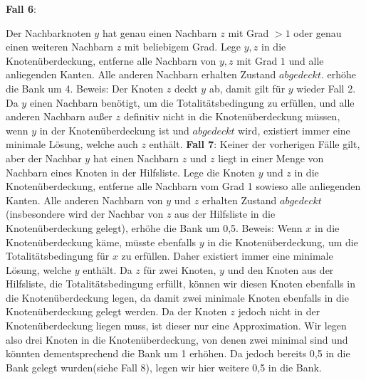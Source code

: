 \documentclass[12pt,onecolumn, notitlepage]{scrartcl}
\begin{document}
\textbf{Fall 6}:\newline
\begin{center}
\end{center}
Der Nachbarknoten $y$ hat genau einen Nachbarn $z$ mit Grad $> 1$ oder genau einen weiteren Nachbarn $z$ mit beliebigem Grad. Lege $y,z$ in die Knotenüberdeckung, entferne alle Nachbarn von $y,z$ mit Grad $1$ und alle anliegenden Kanten. Alle anderen Nachbarn erhalten Zustand $abgedeckt$.  erhöhe die Bank um 4.\newline
Beweis: Der Knoten $z$ deckt $y$ ab, damit gilt für $y$ wieder Fall 2. Da $y$ einen Nachbarn benötigt, um die Totalitätsbedingung zu erfüllen, und alle anderen Nachbarn außer $z$ definitiv nicht in die Knotenüberdeckung müssen, wenn $y$ in der Knotenüberdeckung ist und $abgedeckt$ wird, existiert immer eine minimale Lösung, welche auch $z$ enthält.\newline \newline
\textbf{Fall 7}: \newline
Keiner der vorherigen Fälle gilt, aber der Nachbar $y$ hat einen Nachbarn $z$ und $z$ liegt in einer Menge von Nachbarn eines Knoten in der Hilfsliste. Lege die Knoten $y$ und $z$ in die Knotenüberdeckung, entferne alle Nachbarn vom Grad 1 sowieso alle anliegenden Kanten. Alle anderen Nachbarn von $y$ und $z$ erhalten Zustand $abgedeckt$ (insbesondere wird der Nachbar von $z$ aus der Hilfsliste in die Knotenüberdeckung gelegt), erhöhe die Bank um 0,5.\newline
Beweis: Wenn $x$ in die Knotenüberdeckung käme, müsste ebenfalls $y$ in die Knotenüberdeckung, um die Totalitätsbedingung für $x$ zu erfüllen. Daher existiert immer eine minimale Lösung, welche $y$ enthält. Da $z$ für zwei Knoten, $y$ und den Knoten aus der Hilfsliste, die Totalitätsbedingung erfüllt, können wir diesen Knoten ebenfalls in die Knotenüberdeckung legen, da damit zwei minimale Knoten ebenfalls in die Knotenüberdeckung gelegt werden. Da der Knoten $z$ jedoch nicht in der Knotenüberdeckung liegen muss, ist dieser nur eine Approximation. Wir legen also drei Knoten in die Knotenüberdeckung, von denen zwei minimal sind und könnten dementsprechend die Bank um 1 erhöhen. Da jedoch bereits 0,5 in die Bank gelegt wurden(siehe Fall 8), legen wir hier weitere 0,5 in die Bank.
\end{document}
